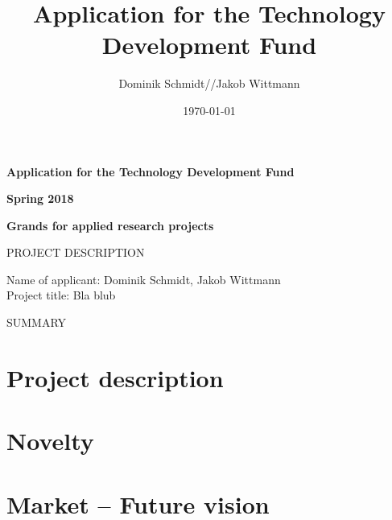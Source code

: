 \documentclass[11pt]{article} %
\title{Application for the Technology Development Fund}
\date{\today}
\author{Dominik Schmidt//Jakob Wittmann}
\begin{document}

\begin{titlepage}

\begin{center}
\LARGE{\textbf{Application for the Technology Development Fund}}

\large{\textbf{Spring 2018}}
\vspace{1.5cm}

\large{\textbf{Grands for applied research projects}}
\end{center}
\vspace{2cm}

\noindent
\large{PROJECT DESCRIPTION}
\vspace{5cm}

\noindent
Name of applicant: Dominik Schmidt, Jakob Wittmann\\
Project title: Bla blub
\vspace{2cm}

\noindent
\large{SUMMARY}

 
\end{titlepage}


\section{Project description}



\section{Novelty}



\section{Market – Future vision}



\printbibliography
\end{document}

